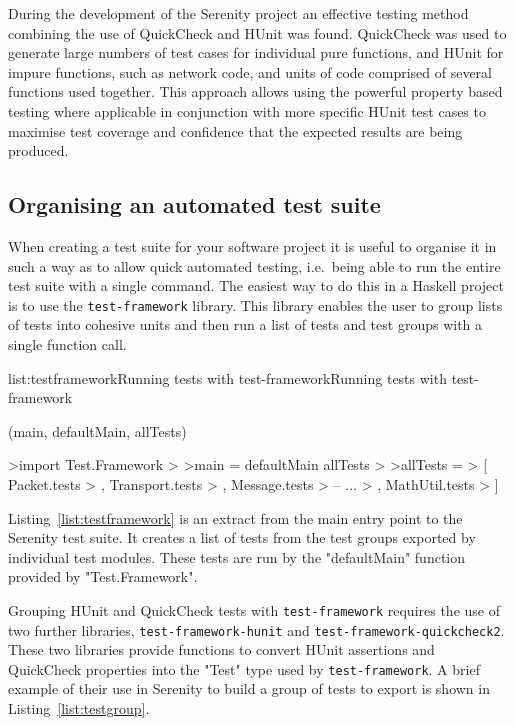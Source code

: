 During the development of the Serenity project an effective testing method combining the
use of QuickCheck and HUnit was found. QuickCheck was used to generate large numbers of
test cases for individual pure functions, and HUnit for impure functions, such as network
code, and units of code comprised of several functions used together. This approach allows
using the powerful property based testing where applicable in conjunction with more specific
HUnit test cases to maximise test coverage and confidence that the expected results are
being produced.


\subsection{Organising an automated test suite}

When creating a test suite for your software project it is useful to organise it in such
a way as to allow quick automated testing, i.e.\ being able to run the entire test suite
with a single command. The easiest way to do this in a Haskell project is to use the
\texttt{test-framework} library. This library enables the user to group lists of tests
into cohesive units and then run a list of tests and test groups with a single function
call.

\vspace{-0.5em}
\begin{listing}{list:testframework}{Running tests with test-framework}{Running tests with test-framework}{}
\end{listing}\vspace{-1.5em}

\functions(main, defaultMain, allTests)
\begin{haskell}
>import Test.Framework
>
>main = defaultMain allTests
>
>allTests =
>  [  Packet.tests
>  ,  Transport.tests
>  ,  Message.tests
>  -- ...
>  ,  MathUtil.tests
>  ]

\end{haskell}
\noindent Listing~\ref{list:testframework} is an extract from the main entry point to
the Serenity test suite. It creates a list of tests from the test groups exported by
individual test modules. These tests are run by the "defaultMain" function provided by
"Test.Framework".

Grouping HUnit and QuickCheck tests with \texttt{test-framework} requires the use of
two further libraries, \texttt{test-framework-hunit} and \texttt{test-framework-quickcheck2}.
These two libraries provide functions to convert HUnit assertions and QuickCheck properties
into the "Test" type used by \texttt{test-framework}. A brief example of their use
in Serenity to build a group of tests to export is shown in Listing~\ref{list:testgroup}.

